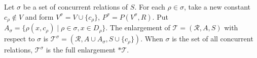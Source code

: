 Let $\sigma$ be a set of concurrent relations of $S$. For each $\rho \in \sigma$, take a new constant $c_\rho \notin V$ and form $V^\sigma = V \cup \{c_\rho\}$, $P^\sigma = P(V^\sigma, R)$. Put $A_\sigma = \{\rho(x, c_\rho) \mid \rho \in \sigma, x \in D_\rho\}$. The enlargement of $\mathcal{T} = (\mathcal{R}, A, S)$ with respect to $\sigma$ is $\mathcal{T}^\sigma = (\mathcal{R}, A \cup A_\sigma, S \cup \{c_\rho\})$. When $\sigma$ is the set of all concurrent relations, $\mathcal{T}^\sigma$ is the full enlargement $*\mathcal{T}$.
